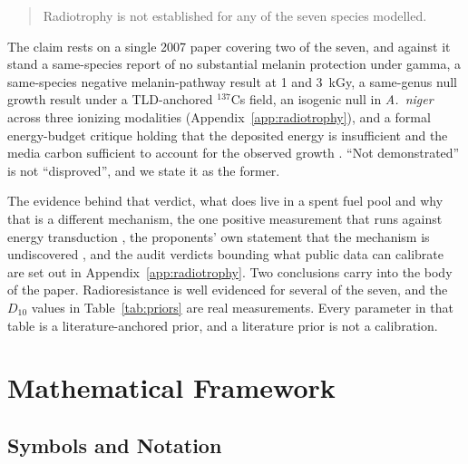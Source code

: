 \documentclass[11pt]{article}
\begin{document}
\begin{quote}
Radiotrophy is not established for any of the seven species modelled.
\end{quote}

The claim rests on a single 2007 paper covering two of the seven, and against it stand a
same-species report of no substantial melanin protection under gamma, a same-species negative
melanin-pathway result at 1 and 3~kGy, a same-genus null growth result under a TLD-anchored
$^{137}$Cs field, an isogenic null in \textit{A.\ niger} across three ionizing modalities
(Appendix~\ref{app:radiotrophy}), and a formal energy-budget critique holding that the deposited energy is
insufficient and the media carbon sufficient to account for the observed growth
\cite{walberg2015}. ``Not demonstrated'' is not ``disproved'', and we state it as the former.

The evidence behind that verdict, what does live in a spent fuel pool and why that is a
different mechanism, the one positive measurement that runs against energy transduction
\cite{turick2011}, the proponents' own statement that the mechanism is undiscovered
\cite{casadevall2017}, and the audit verdicts bounding what public data can calibrate are set
out in Appendix~\ref{app:radiotrophy}. Two conclusions carry into the body of the paper.
Radioresistance is well evidenced for several of the seven, and the $D_{10}$ values in
Table~\ref{tab:priors} are real measurements. Every parameter in that table is a
literature-anchored prior, and a literature prior is not a calibration.

\section{Mathematical Framework}\label{sec:framework}

\subsection{Symbols and Notation}
\end{document}
